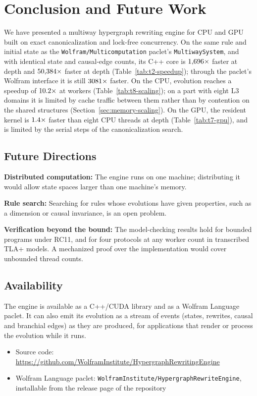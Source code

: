 \section{Conclusion and Future Work}
\label{sec:conclusion}

We have presented a multiway hypergraph rewriting engine for CPU and GPU built on exact
canonicalization and lock-free concurrency. On the same rule and initial state as the
\texttt{Wolfram/\allowbreak Multicomputation} paclet's \texttt{MultiwaySystem}, and with identical
state and causal-edge counts, its C++ core is $1{,}696\times$ faster at depth
\SpeedupLowDepth{} and $50{,}384\times$ faster at depth \SpeedupHighDepth{}
(Table~\ref{tab:t2-speedup}); through the paclet's Wolfram interface it is still
$3081\times$ faster. On the CPU, evolution reaches a speedup of
$10.2\times$ at \MaxHostSpeedupThreads{} workers (Table~\ref{tab:t8-scaling}); on a
part with eight L3 domains it is limited by cache traffic between them rather than by contention on
the shared structures (Section~\ref{sec:memory-scaling}). On the GPU, the resident kernel is
$1.4\times$ faster than eight CPU threads at depth \GpuDeepestDepth{}
(Table~\ref{tab:t7-gpu}), and is limited by the serial steps of the canonicalization search.


\subsection{Future Directions}

\textbf{Distributed computation:} The engine runs on one machine; distributing it would allow
state spaces larger than one machine's memory.

\textbf{Rule search:} Searching for rules whose evolutions have given properties, such as a
dimension or causal invariance, is an open problem.

\textbf{Verification beyond the bound:} The model-checking results hold for bounded programs under
RC11, and for four protocols at any worker count in transcribed TLA+ models. A mechanized proof
over the implementation would cover unbounded thread counts.

\subsection{Availability}

The engine is available as a C++/CUDA library and as a Wolfram Language paclet. It can also emit
its evolution as a stream of events (states, rewrites, causal and branchial edges) as they are
produced, for applications that render or process the evolution while it runs.
\begin{itemize}
    \item Source code: \url{https://github.com/WolframInstitute/HypergraphRewritingEngine}
    \item Wolfram Language paclet: \texttt{WolframInstitute/}\allowbreak\texttt{HypergraphRewriteEngine},
          installable from the release page of the repository
\end{itemize}

